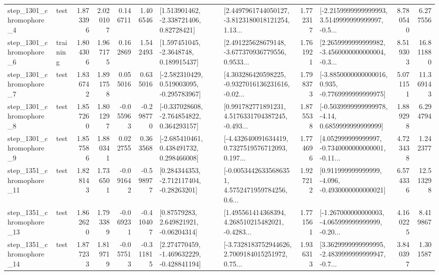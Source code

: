 \begin{tabular}{llrrrrllrlrr}
  step\_1301\_chromophore\_4 &      test &      1.873396 &    2.020107 &      0.146711 &  1.406546 &     [1.513901462, -2.338721406, 0.82728421] &  [2.4497961744050127, -3.8123180018121254, 1.13... &       1.772317 &  [-2.2159999999999993, 3.5149999999999997, -0.5... &            8.780540 &          6.277556 \\
  step\_1301\_chromophore\_6 &  training &      1.804306 &    1.967175 &      0.162869 &  1.542493 &      [1.597451045, -2.3648748, 0.189915437] &  [2.491225628679148, -3.677370936779556, 0.9533... &       1.761921 &  [2.2659999999999982, -3.4560000000000004, -0.3... &            8.519303 &         16.811880 \\
  step\_1301\_chromophore\_7 &      test &      1.836742 &    1.891758 &      0.055016 &  0.635016 &   [-2.582310429, 0.519003095, -0.295783967] &  [4.303286420598225, -0.9327016136231616, -0.02... &       1.798373 &  [-3.8850000000000016, 0.935, -0.7769999999999975] &            5.071151 &         11.369143 \\
  step\_1301\_chromophore\_8 &      test &      1.857260 &    1.801297 &     -0.055963 & -0.298770 &   [-0.337028608, -2.764854822, 0.364293157] &  [0.991782771891231, 4.5176331704387245, -0.493... &       1.875538 &   [-0.5039999999999978, -4.14, 0.6859999999999999] &            1.889298 &          6.294794 \\
  step\_1301\_chromophore\_9 &      test &      1.857586 &    1.880341 &      0.022755 &  0.363568 &    [-2.685410461, 0.438491732, 0.298466008] &  [-4.432640091634419, 0.7327519576712093, 0.197... &       1.774696 &  [4.052999999999997, -0.7340000000000001, -0.11... &            4.723438 &          1.242377 \\
 step\_1351\_chromophore\_11 &      test &      1.828143 &    1.736501 &     -0.091642 & -0.598977 &    [0.284344353, -2.712117404, -0.28263201] &  [-0.00534426335686351, 4.5752471959784256, 0.6... &       1.927212 &   [0.911999999999999, -4.096, -0.4930000000000021] &            6.574336 &         12.513298 \\
 step\_1351\_chromophore\_13 &      test &      1.862620 &    1.793389 &     -0.069231 & -0.410407 &      [0.87579283, 2.649821921, -0.06204314] &  [1.495561414368394, 4.268510215482021, -0.4283... &       1.771561 &  [-1.267000000000003, -4.065999999999999, -0.20... &            4.160225 &          8.419867 \\
 step\_1351\_chromophore\_14 &      test &      1.877233 &    1.819719 &     -0.057513 & -0.311815 &   [2.274770459, -1.469632229, -0.428841194] &  [-3.7328183752944626, 2.7009184015251972, 0.75... &       1.936313 &  [3.3629999999999995, -2.4839999999999947, -0.7... &            3.840397 &          1.301587 \\

\end{tabular}
